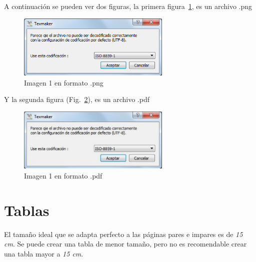 \documentclass[thesis]{udpbook}
\begin{document}
\parindent=0pt A continuación se pueden ver dos figuras, la primera figura~\ref{Imagen1png}, es un archivo .png 

 \begin{figure}
  \begin{center}
    \includegraphics[width=0.65\textwidth, trim = 0mm 0mm 0mm 0mm, clip]{Figuras/imagen1.png}
  \end{center}
  \caption{Imagen 1 en formato .png}
  \label{Imagen1png}
  \end{figure}

\vspace{0.5cm}
\parindent=30pt Y la segunda figura (Fig.~\ref{Imagen1pdf}), es un archivo .pdf

 \begin{figure}
  \begin{center}
    \includegraphics[width=0.65\textwidth, trim = 0mm 0mm 0mm 0mm, clip]{Figuras/imagen1.pdf}
  \end{center}
  \caption{Imagen 1 en formato .pdf}
  \label{Imagen1pdf}
  \end{figure}
  




\section{Tablas} \label{chsub:Tablas}



\parindent=0pt  El tamaño ideal que se adapta perfecto a las páginas pares e impares es de \emph{15 cm}. Se puede crear una tabla de menor tamaño, pero no es recomendable crear una tabla mayor a \emph{15 cm}. 
\end{document}
